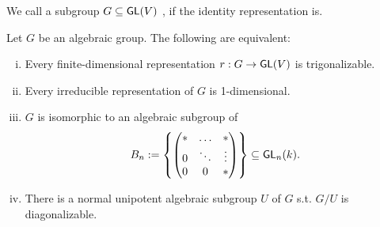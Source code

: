 \begin{definition}
We call a subgroup $G \subseteq{} \textsf{GL}(V)$ , if the identity representation is.
\end{definition}
\begin{lemma}
	Let $G$ be an algebraic group. The following are equivalent:
	\begin{enumerate}[(i)]
		\item Every finite-dimensional representation $r : G \overset{}{\rightarrow} \textsf{GL}(V)$ is trigonalizable.
		\item Every irreducible representation of $G$ is 1-dimensional.
		\item $G$ is isomorphic to an algebraic subgroup of
		\[ B_n := \left\lbrace
	\left(\begin{matrix} * & \ldots & *\\
	0 & \ddots & \vdots\\ 0 & 0& * \end{matrix}\right)	
	\right\rbrace \subseteq \textsf{GL}_n(k). \]
\item There is a normal unipotent algebraic subgroup $U$ of $G$ s.t. $G/U$ is diagonalizable.
	\end{enumerate}
\end{lemma}
